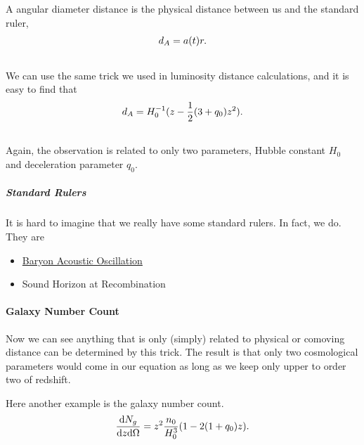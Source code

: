 \documentclass[letterpaper,10pt,english]{sphinxmanual}
\begin{document}
{A angular diameter distance is the physical distance between us and the standard ruler,
\begin{gather}
\begin{split}d_A = a(t)r .\end{split}\notag\\\begin{split}\end{split}\notag
\end{gather}
We can use the same trick we used in luminosity distance calculations, and it is easy to find that
\begin{gather}
\begin{split}d_A = H_0^{-1} (z - \frac{1}{2} (3 + q_0)z^2 ) .\end{split}\notag\\\begin{split}\end{split}\notag
\end{gather}
Again, the observation is related to only two parameters, Hubble constant $H_0$ and deceleration parameter $q_0$.


\subparagraph{Standard Rulers}
\label{Cosmology/cosmoIndex:standard-rulers}
It is hard to imagine that we really have some standard rulers. In fact, we do. They are
\begin{itemize}
\item {} 
\href{https://en.wikipedia.org/wiki/Baryon\_acoustic\_oscillations}{Baryon Acoustic Oscillation}

\item {} 
Sound Horizon at Recombination

\end{itemize}


\paragraph{Galaxy Number Count}
\label{Cosmology/cosmoIndex:galaxy-number-count}
Now we can see anything that is only (simply) related to physical or comoving distance can be determined by this trick. The result is that only two cosmological parameters would come in our equation as long as we keep only upper to order two of redshift.

Here another example is the galaxy number count.
\begin{gather}
\begin{split}\frac{\mathrm d N_g}{\mathrm d z \mathrm d\Omega} = z^2 \frac{n_0}{H_0^3}  (1-2(1+q_0) z) .\end{split}\notag\\\begin{split}\end{split}\notag
\end{gather}

}
\end{document}
